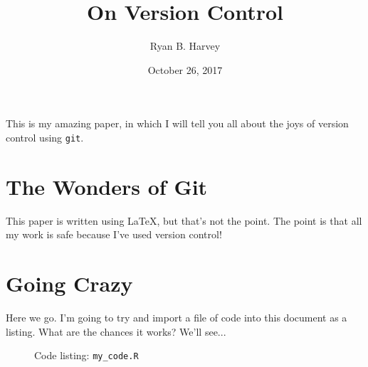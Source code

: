 \documentclass{article}      %
\title{On Version Control}   %
\author{Ryan B. Harvey}      %
\date{October 26, 2017}      %
\def\code#1{\texttt{#1}}
\begin{document}

\maketitle                   %

This is my amazing paper, in which I will tell you all about the joys
of version control using \code{git}.

\section{The Wonders of Git} %

This paper is written using
\LaTeX,    %
but that's not the point. The point is that all my
work is safe because I've used version control!

\section{Going Crazy}
Here we go. I'm going to try and import a file of code
into this document as a listing. What are the chances it
works? We'll see...

\begin{figure}
  \caption{Code listing: \code{my\_code.R}}
  
\end{figure}
\end{document}
